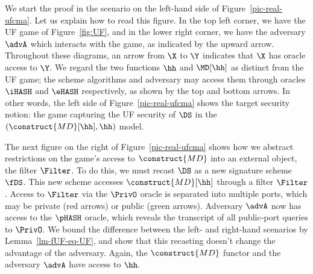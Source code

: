 We start the proof in the scenario on the left-hand side of Figure~\ref{pic-real-ufcma}.
Let us explain how to read this figure.
In the top left corner, we have the UF game of Figure~\ref{fig:UF}, and in the lower right corner, we have the adversary $\advA$ which interacts with the game, as indicated by the upward arrow.
Throughout these diagrams, an arrow from $\X$ to $\Y$ indicates that $\X$ has oracle access to $\Y$.
We regard the two functions $\hh$ and $\MD[\hh]$ as distinct from the UF game; the scheme algorithms and adversary may access them through oracles $\iHASH$ and $\eHASH$ respectively, as shown by the top and bottom arrows.
In other words, the left side of Figure~\ref{pic-real-ufcma} shows the target security notion: the game capturing the UF security of $\DS$ in the $(\construct{MD}[\hh], \hh)$ model.

The next figure on the right of Figure~\ref{pic-real-ufcma} shows how we abstract restrictions on the game's access to $\construct{MD}$ into an external object, the filter $\Filter$.
To do this, we must recast $\DS$ as a new signature scheme $\fDS$.
This new scheme accesses $\construct{MD}[\hh]$ through a filter $\Filter$.
Access to $\Filter$ via the $\PrivO$ oracle is separated into multiple ports, which may be private (red arrows) or public (green arrows).
Adversary $\advA$ now has access to the $\pHASH$ oracle, which reveals the transcript of all public-port queries to $\PrivO$.
We bound the difference between the left- and right-hand scenarios by Lemma~\ref{lm-fUF-eq-UF}, and show that this recasting doesn't change the advantage of the adversary.
Again, the $\construct{MD}$ functor and the adversary $\advA$ have access to $\hh$.

